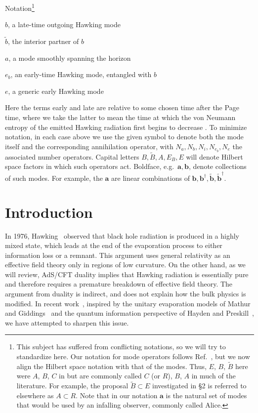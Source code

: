 \documentclass[12pt]{article}
\begin{document}
\bigskip
\centerline{\sc Notation\footnote{\label{DP}This subject has suffered from conflicting notations, so we will try to standardize here.  Our notation for mode operators follows Ref.~\cite{Almheiri:2012rt}, but we now align the Hilbert space notation with that of the modes.  Thus, $E$, $B$, $\tilde B$ here were $A$, $B$, $C$ in \cite{Almheiri:2012rt} but are commonly called $C$ (or $R$), $B$, $A$ in much of the literature.  For example, the proposal $\tilde B \subset E$ investigated in \S2 is referred to elsewhere as $A \subset R$.
Note that in our notation $\bm a$ is the natural set of modes that would be used by an infalling observer, commonly called Alice.}}


\indent

$b$, a late-time outgoing Hawking mode

$\tilde b$, the interior partner of $b$

$a$, a mode smoothly spanning the horizon

 $e_b$, an early-time Hawking mode, entangled with $b$

 $e$, a generic early Hawking mode

Here the terms early and late are relative to some chosen time after the Page time, where we take the latter to mean the time at which the von Neumann entropy of the emitted Hawking radiation first begins to decrease \cite{Page:1993df}.  To minimize notation, in each case above we use the given symbol to denote both the mode itself and the corresponding annihilation operator, with $N_a,N_b,N_i,N_{e_b},N_e$ the associated number operators.  Capital letters $B,\tilde B, A ,E_B, E$ will denote Hilbert space factors in which such operators act.  Boldface, e.g.\ $\bm a, \bm b$, denote collections of such modes. For example, the $\bm a$ are linear combinations of $\bm b, \bm b^\dagger, \tilde {\bm b}, \tilde {\bm b}^\dagger$.





\section{Introduction}

In 1976, Hawking~\cite{Hawking:1976ra} observed that black hole radiation is produced in a highly mixed state, which leads at the end of the evaporation process  to either information loss or  a remnant.  This argument uses general relativity as an effective field theory only in regions of low curvature.  On the other hand, as we will review, AdS/CFT duality implies that Hawking radiation is essentially pure and therefore requires a premature breakdown of effective field theory.  The argument from duality is indirect, and does not explain how the bulk physics is modified.  In recent work~\cite{Almheiri:2012rt}, inspired by the unitary evaporation models  of Mathur
\cite{Mathur:2009hf} and Giddings~\cite{Giddings:2011ks,Giddings:2012bm}
and the quantum information perspective of Hayden and Preskill~\cite{Hayden:2007cs}, we have attempted to sharpen this issue.
\end{document}
